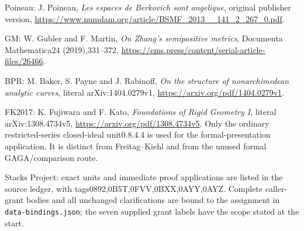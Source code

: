 \documentclass[
  11pt,
]{article}
\begin{document}
Poineau: J. Poineau, \emph{Les espaces de Berkovich sont angelique},
original publisher version,
\url{https://www.numdam.org/article/BSMF_2013__141_2_267_0.pdf}.

GM: W. Gubler and F. Martin, \emph{On Zhang's semipositive metrics},
Documenta Mathematica24 (2019),331--372,
\url{https://ems.press/content/serial-article-files/26466}.

BPR: M. Baker, S. Payne and J. Rabinoff, \emph{On the structure of
nonarchimedean analytic curves}, literal arXiv:1404.0279v1,
\url{https://arxiv.org/pdf/1404.0279v1}.

FK2017: K. Fujiwara and F. Kato, \emph{Foundations of Rigid Geometry I},
literal arXiv:1308.4734v5, \url{https://arxiv.org/pdf/1308.4734v5}. Only
the ordinary restricted-series closed-ideal unit0.8.4.4 is used for the
formal-presentation application. It is distinct from Freitag--Kiehl and
from the unused formal GAGA/comparison route.

Stacks Project: exact units and immediate proof applications are listed
in the source ledger, with tags0892,0B5T,0FVV,0BXX,0AYY,0AYZ. Complete
caller-grant bodies and all unchanged clarifications are bound to the
assignment in \texttt{data-bindings.json}; the seven supplied grant
labels have the scope stated at the start.
\end{document}
